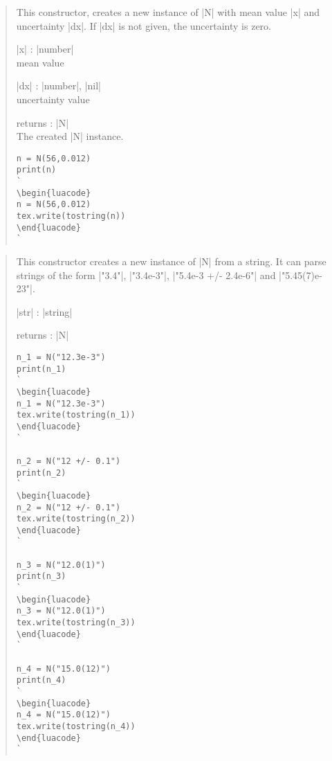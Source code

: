 \documentclass{ltxdoc}
\begin{document}
\begin{quote}
  This constructor, creates a new instance of |N| with mean value |x| and uncertainty |dx|. If |dx| is not given, the uncertainty is zero.

  \begin{description}
  \item |x| : |number|\\
    mean value

  \item |dx| : |number|, |nil|\\
    uncertainty value

  \item returns : |N|\\
    The created |N| instance.
  \end{description}

\begin{lstlisting}
n = N(56,0.012)
print(n)
`
\begin{luacode}
n = N(56,0.012)
tex.write(tostring(n))
\end{luacode}
`
\end{lstlisting}

\end{quote}

\begin{quote}
  This constructor creates a new instance of |N| from a string. It can parse strings of the form |"3.4"|, |"3.4e-3"|, |"5.4e-3 +/- 2.4e-6"| and |"5.45(7)e-23"|.

  \begin{description}
  \item |str| : |string|

  \item returns : |N|
  \end{description}

\begin{lstlisting}
n_1 = N("12.3e-3")
print(n_1)
`
\begin{luacode}
n_1 = N("12.3e-3")
tex.write(tostring(n_1))
\end{luacode}
`

n_2 = N("12 +/- 0.1")
print(n_2)
`
\begin{luacode}
n_2 = N("12 +/- 0.1")
tex.write(tostring(n_2))
\end{luacode}
`

n_3 = N("12.0(1)")
print(n_3)
`
\begin{luacode}
n_3 = N("12.0(1)")
tex.write(tostring(n_3))
\end{luacode}
`

n_4 = N("15.0(12)")
print(n_4)
`
\begin{luacode}
n_4 = N("15.0(12)")
tex.write(tostring(n_4))
\end{luacode}
`
\end{lstlisting}
\end{quote}
\end{document}
